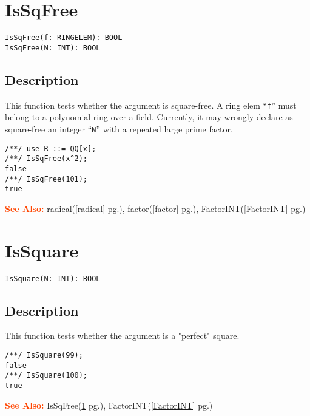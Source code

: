 \documentclass[a4paper]{mybook}
\newenvironment{command}{}{} %
\newcommand\SeeAlso{\par\textcolor{OrangeRed}{\textbf{\large See Also: }}}
\begin{document}
\section{IsSqFree}
\label{IsSqFree}
\begin{command} %


\begin{Verbatim}[label=syntax, rulecolor=\color{MidnightBlue},
frame=single]
IsSqFree(f: RINGELEM): BOOL
IsSqFree(N: INT): BOOL
\end{Verbatim}


\subsection*{Description}

This function tests whether the argument is square-free.
A ring elem ``\verb&f&'' must belong to a polynomial ring over a field.
Currently, it may wrongly declare as square-free an integer ``\verb&N&'' with
a repeated large prime factor.
\begin{Verbatim}[label=example, rulecolor=\color{PineGreen}, frame=single]
/**/ use R ::= QQ[x];
/**/ IsSqFree(x^2);
false
/**/ IsSqFree(101);
true
\end{Verbatim}


\SeeAlso %
  radical(\ref{radical} pg.\pageref{radical}), 
    factor(\ref{factor} pg.\pageref{factor}), 
    FactorINT(\ref{FactorINT} pg.\pageref{FactorINT})
\end{command} %

\section{IsSquare}
\label{IsSquare}
\begin{command} %


\begin{Verbatim}[label=syntax, rulecolor=\color{MidnightBlue},
frame=single]
IsSquare(N: INT): BOOL
\end{Verbatim}


\subsection*{Description}

This function tests whether the argument is a "perfect" square.
\begin{Verbatim}[label=example, rulecolor=\color{PineGreen}, frame=single]
/**/ IsSquare(99);
false
/**/ IsSquare(100);
true
\end{Verbatim}


\SeeAlso %
  IsSqFree(\ref{IsSqFree} pg.\pageref{IsSqFree}), 
    FactorINT(\ref{FactorINT} pg.\pageref{FactorINT})
\end{command} %
\end{document}
